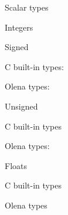 \begin{list}{--}{}
\item Scalar types
  \begin{list}{--}{}
  \item Integers
    \begin{list}{--}{}
    \item Signed
      \begin{list}{--}{}
      \item C built-in types:
        \begin{list}{--}{}
        \item {}
        \item {}
        \item {}
        \item {}
        \end{list}
      \item Olena types: 
      \end{list}
    \item Unsigned
      \begin{list}{--}{}
      \item C built-in types
        \begin{list}{--}{}
        \item {}
        \item {}
        \item {}
        \item {}
        \end{list}
      \item Olena types: 
      \end{list}
    \end{list}
  \item Floats
    \begin{list}{--}{}
    \item C built-in types
      \begin{list}{--}{}
        \item {}
        \item {}
      \end{list}
    \item Olena types
      \begin{list}{--}{}
        \item {}
        \item {}
      \end{list}

\end{list}
\end{list}
\end{list}

